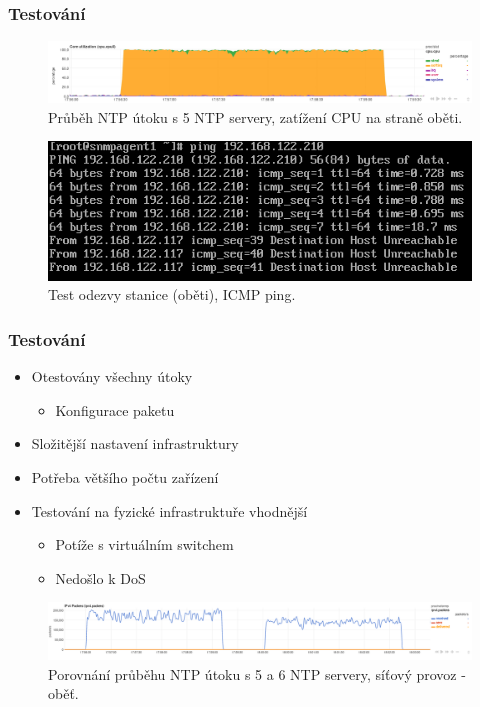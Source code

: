 \documentclass[%
12pt,       				%
t,                  %
aspectratio=1610,   %
unicode,						%
czech,              %
]{beamer}				    	%
\begin{document}

\begin{frame}
\frametitle{Testování}
\begin{figure}%
	\centering
	\vspace{0.2cm}	              %
	\includegraphics[width=0.99\columnwidth]{obrazky/grafy/graph_ntp_cpu_5ampl.png}
	\caption{Průběh NTP útoku s 5 NTP servery, zatížení CPU na straně oběti.}
\end{figure}

\begin{figure}%
	\centering
	\vspace{0.2cm}	              %
	\includegraphics[width=0.6\columnwidth]{obrazky/grafy/ping_ntp_5ampl.png}
	\caption{Test odezvy stanice (oběti), ICMP ping.}
\end{figure}
\end{frame}


\begin{frame}
\frametitle{Testování}
\begin{itemize}
	\item Otestovány všechny útoky
	\begin{itemize}
		\item Konfigurace paketu 
	\end{itemize}
	\item Složitější nastavení infrastruktury
	\item Potřeba většího počtu zařízení
	\item Testování na fyzické infrastruktuře vhodnější
	\begin{itemize}
		\item Potíže s virtuálním switchem
		\item Nedošlo k DoS
	\end{itemize}
\end{itemize}

\begin{figure}%
	\centering
	\vspace{0.4cm}	              %
	\includegraphics[width=0.92\columnwidth]{obrazky/grafy/graph_ntp_traffic_5ampl_vs6ampl.png}
	\caption{Porovnání průběhu NTP útoku s 5 a 6 NTP servery, síťový provoz - oběť.}
\end{figure}
\end{frame}
\end{document}

